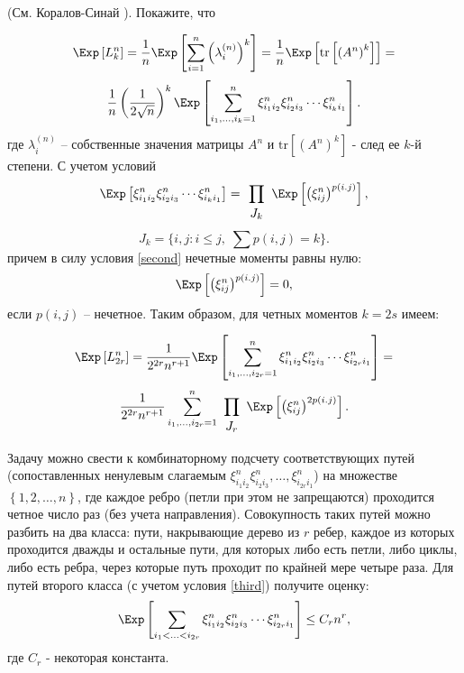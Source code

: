 \begin{ordre} (См. Коралов-Синай \cite{7}). Покажите, что 

\[\Exp\left[L_{k}^{n} \right]=\frac{1}{n} \Exp\left[\sum _{i=1}^{n}\left(\lambda _{i}^{(n)} \right)^{k}  \right]=\frac{1}{n} \Exp\left[\mathrm{tr}\left[\left(A^{n} \right)^{k} \right]\right] = \]\[ \frac{1}{n} \left(\frac{1}{2\sqrt{n} } \right)^{k} \Exp\left[\sum _{i_{1} ,\ldots ,i_{k} =1}^{n}\xi _{i_{1} i_{2} }^{n} \xi _{i_{2} i_{3} }^{n} \cdots \xi _{i_{k} i_{1} }^{n}  \right].\] 
\noindent где $\lambda _{i}^{(n)} $ -- собственные значения матрицы $A^{n} $ и $\mathrm{tr}\left[\left(A^{n} \right)^{k} \right]$ - след ее $k$-й степени.
С учетом условий \[\Exp\left[\xi _{i_{1} i_{2} }^{n} \xi _{i_{2} i_{3} }^{n} \cdots \xi _{i_{k} i_{1} }^{n} \right]=\prod _{\begin{array}{l} {\small J_k} \end{array}}\Exp\left[\left(\xi _{ij}^{n} \right)^{p(i.j)} \right], \]\[J_k = \{ i,j: i \leq j, \;
\sum p(i,j) = k\}. \] причем в силу условия \ref{second} нечетные моменты равны нулю: $$\Exp\left[\left(\xi _{ij}^{n} \right)^{p(i.j)} \right]=0,$$ если $p(i,j)$ -- нечетное. Таким образом, для четных моментов $k=2s$ имеем:

\[\Exp\left[L_{2r}^{n} \right]=\frac{1}{2^{2r} n^{r+1} } \Exp\left[\sum _{i_{1} ,\ldots ,i_{2r} =1}^{n}\xi _{i_{1} i_{2} }^{n} \xi _{i_{2} i_{3} }^{n} \cdots \xi _{i_{2r} i_{1} }^{n}  \right]= \]\[ \frac{1}{2^{2r} n^{r+1} } \sum _{i_{1} ,\ldots ,i_{2r} =1}^{n}\prod _{\begin{array}{c} {\scriptsize J_r }\end{array}}\Exp\left[\left(\xi _{ij}^{n} \right)^{2p(i.j)} \right]  .\] 

 Задачу можно свести к комбинаторному подсчету соответствующих путей (сопоставленных ненулевым слагаемым $\xi _{i_{1} i_{2} }^{n} \xi _{i_{2} i_{3} }^{n}, \ldots, \xi _{i_{2r} i_{1} }^{n} $) на множестве $\left\{1,2,\ldots ,n\right\}$, где каждое ребро (петли при этом не запрещаются) проходится четное число раз (без учета направления). Совокупность таких путей можно разбить на два класса: пути, накрывающие дерево из $r$ ребер, каждое из которых проходится дважды и остальные пути, для которых либо есть петли, либо циклы, либо есть ребра, через которые путь проходит по крайней мере четыре раза. Для путей второго класса (с учетом условия \ref{third}) получите оценку: \[
 \Exp\left[
    \sum  \limits_{ i_{1} < \ldots < i_{2r} } \xi _{i_{1} i_{2} }^{n} \xi _{i_{2} i_{3} }^{n} \cdots           \xi _{i_{2r} i_{1} }^{n}  
\right]\le C_{r} n^{r} ,
 \] \noindent где $C_{r} $ - некоторая константа.


\end{ordre}

